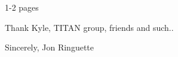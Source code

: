\documentclass[jon_ringuette_thesis.tex]{subfiles}
\begin{document}
\begin{acknowledgments}
  1-2 pages
  
  Thank Kyle, TITAN group, friends and such..

  Sincerely,
  Jon Ringuette
\end{acknowledgments}
\end{document}
